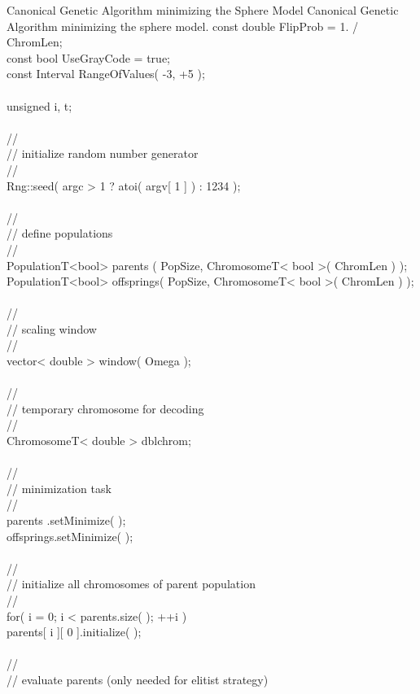 \begin{programlisting}{Canonical Genetic Algorithm minimizing the Sphere Model}{
    Canonical Genetic Algorithm minimizing the sphere model.}
    const double   FlipProb    = 1. / ChromLen;\\
    const bool     UseGrayCode = true;\\
    const Interval RangeOfValues( -3, +5 );\\
\\
    unsigned i, t;\\
\\
    //\\
    // initialize random number generator\\
    //\\
    Rng::seed( argc > 1 ? atoi( argv[ 1 ] ) : 1234 );\\
\\
    //\\
    // define populations\\
    //\\
    PopulationT<bool> parents   ( PopSize, ChromosomeT< bool >( ChromLen ) );\\
    PopulationT<bool> offsprings( PopSize, ChromosomeT< bool >( ChromLen ) );\\
\\
    //\\
    // scaling window\\
    //\\
    vector< double > window( Omega );\\
\\
    //\\
    // temporary chromosome for decoding\\
    //\\
    ChromosomeT< double > dblchrom;\\
\\
    //\\
    // minimization task\\
    //\\
    parents   .setMinimize( );\\
    offsprings.setMinimize( );\\
\\
    //\\
    // initialize all chromosomes of parent population\\
    //\\
    for( i = 0; i < parents.size( ); ++i )\\
        parents[ i ][ 0 ].initialize( );\\
\\
    //\\
    // evaluate parents (only needed for elitist strategy)\\

\end{programlisting}
